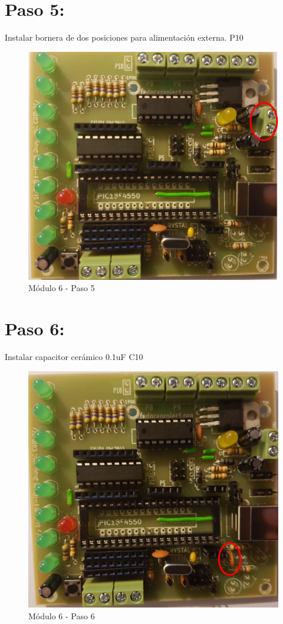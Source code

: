 \newpage

\section{Paso 5:}

Instalar bornera de dos posiciones para alimentación externa. P10

\begin{figure}[h]
	\centering
	\includegraphics[width=0.8\linewidth]{Modulo_6/M6_5}
	\caption{Módulo 6 - Paso 5}
	\label{fig:M6_5}
\end{figure}

\newpage

\section{Paso 6:}

Instalar capacitor cerámico 0.1uF C10

\begin{figure}[h]
	\centering
	\includegraphics[width=0.8\linewidth]{Modulo_6/M6_6}
	\caption{Módulo 6 - Paso 6}
	\label{fig:M6_6}
\end{figure}

